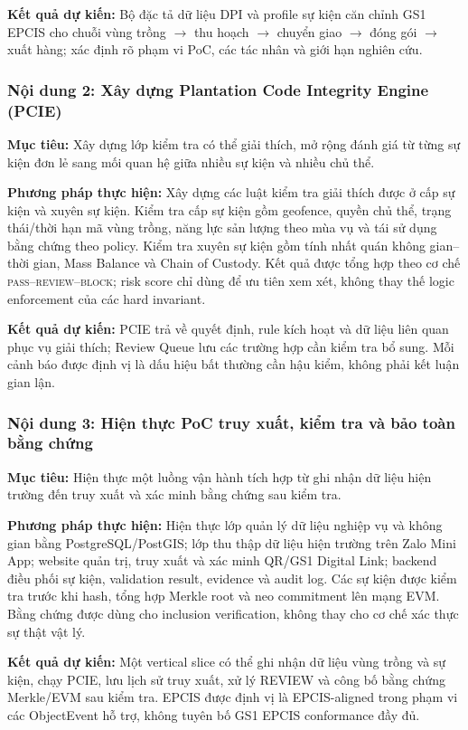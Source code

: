 \documentclass[letterpaper,11pt]{article}
\begin{document}
\textbf{Kết quả dự kiến:} Bộ đặc tả dữ liệu DPI và profile sự kiện căn chỉnh GS1 EPCIS cho chuỗi vùng trồng $\rightarrow$ thu hoạch $\rightarrow$ chuyển giao $\rightarrow$ đóng gói $\rightarrow$ xuất hàng; xác định rõ phạm vi PoC, các tác nhân và giới hạn nghiên cứu.

\subsubsection*{Nội dung 2: Xây dựng Plantation Code Integrity Engine (PCIE)}
\textbf{Mục tiêu:} Xây dựng lớp kiểm tra có thể giải thích, mở rộng đánh giá từ từng sự kiện đơn lẻ sang mối quan hệ giữa nhiều sự kiện và nhiều chủ thể.

\textbf{Phương pháp thực hiện:} Xây dựng các luật kiểm tra giải thích được ở cấp sự kiện và xuyên sự kiện. Kiểm tra cấp sự kiện gồm geofence, quyền chủ thể, trạng thái/thời hạn mã vùng trồng, năng lực sản lượng theo mùa vụ và tái sử dụng bằng chứng theo policy. Kiểm tra xuyên sự kiện gồm tính nhất quán không gian--thời gian, Mass Balance và Chain of Custody. Kết quả được tổng hợp theo cơ chế \textsc{pass}--\textsc{review}--\textsc{block}; risk score chỉ dùng để ưu tiên xem xét, không thay thế logic enforcement của các hard invariant.

\textbf{Kết quả dự kiến:} PCIE trả về quyết định, rule kích hoạt và dữ liệu liên quan phục vụ giải thích; Review Queue lưu các trường hợp cần kiểm tra bổ sung. Mỗi cảnh báo được định vị là dấu hiệu bất thường cần hậu kiểm, không phải kết luận gian lận.

\subsubsection*{Nội dung 3: Hiện thực PoC truy xuất, kiểm tra và bảo toàn bằng chứng}
\textbf{Mục tiêu:} Hiện thực một luồng vận hành tích hợp từ ghi nhận dữ liệu hiện trường đến truy xuất và xác minh bằng chứng sau kiểm tra.

\textbf{Phương pháp thực hiện:} Hiện thực lớp quản lý dữ liệu nghiệp vụ và không gian bằng PostgreSQL/PostGIS; lớp thu thập dữ liệu hiện trường trên Zalo Mini App; website quản trị, truy xuất và xác minh QR/GS1 Digital Link; backend điều phối sự kiện, validation result, evidence và audit log. Các sự kiện được kiểm tra trước khi hash, tổng hợp Merkle root và neo commitment lên mạng EVM. Bằng chứng được dùng cho inclusion verification, không thay cho cơ chế xác thực sự thật vật lý.

\textbf{Kết quả dự kiến:} Một vertical slice có thể ghi nhận dữ liệu vùng trồng và sự kiện, chạy PCIE, lưu lịch sử truy xuất, xử lý REVIEW và công bố bằng chứng Merkle/EVM sau kiểm tra. EPCIS được định vị là EPCIS-aligned trong phạm vi các ObjectEvent hỗ trợ, không tuyên bố GS1 EPCIS conformance đầy đủ.
\end{document}
